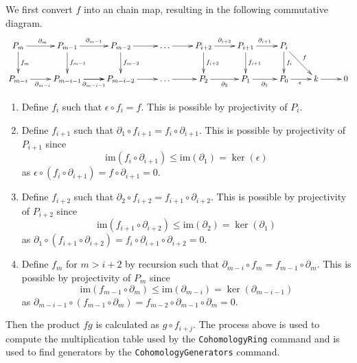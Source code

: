 \documentclass[12pt]{article}
\begin{document}
We first convert $f$ into an chain map,
resulting in the following commutative diagram.
\begin{equation}\label{ff}\xymatrix{
P_m\ar[r]^{\partial_m}\ar[d]^{f_m}
&P_{m-1}\ar[d]^{f_{m-1}}\ar[r]^{\partial_{m-1}}
&P_{m-2}\ar[d]^{f_{m-2}}\ar[r]
&\dots\ar[r]
&P_{i+2}\ar[r]^{\partial_{i+2}}\ar[d]^{f_{i+2}}
&P_{i+1}\ar[r]^{\partial_{i+1}}\ar[d]^{f_{i+1}}
&P_i\ar[d]^{f_i}\ar[dr]^f
\\
P_{m-i}\ar[r]_{\partial_{m-i}}
&P_{m-i-1}\ar[r]\ar[r]_{\partial_{m-i-1}}
&P_{m-i-2}\ar[r]
&\dots\ar[r]
&P_2\ar[r]_{\partial_2}
&P_1\ar[r]_{\partial_1}
&P_0\ar[r]_\epsilon&k\ar[r]&0
}\end{equation}
\begin{enumerate}
\item Define $f_i$ such that $\epsilon\circ f_i=f$.
This is possible by projectivity of $P_i$.
\item Define $f_{i+1}$ such that $\partial_1\circ f_{i+1}
=f_i\circ\partial_{i+1}$.
This is possible by projectivity of $P_{i+1}$ since
\[\mathrm{im}\left(f_i\circ\partial_{i+1}\right)
\le\mathrm{im}\left(\partial_1\right)
=\ker\left(\epsilon\right)\]
as $\epsilon\circ\left(f_i\circ\partial_{i+1}\right)
=f\circ\partial_{i+1}=0$.
\item Define $f_{i+2}$ such that $\partial_2\circ f_{i+2}
=f_{i+1}\circ\partial_{i+2}$.
This is possible by projectivity of $P_{i+2}$ since
\[\mathrm{im}\left(f_{i+1}\circ\partial_{i+2}\right)
\le\mathrm{im}\left(\partial_2\right)
=\ker\left(\partial_1\right)\]
as $\partial_1\circ\left(f_{i+1}\circ\partial_{i+2}\right)
=f_i\circ\partial_{i+1}\circ\partial_{i+2}=0$.
\item Define $f_m$ for $m>i+2$ by recursion 
such that $\partial_{m-i}\circ f_m
=f_{m-1}\circ\partial_m$.
This is possible by projectivity of $P_m$ since
\[\mathrm{im}\left(f_{m-1}\circ\partial_m\right)
\le\mathrm{im}\left(\partial_{m-i}\right)
=\ker\left(\partial_{m-i-1}\right)\]
as $\partial_{m-i-1}\circ\left(f_{m-1}\circ\partial_m\right)
=f_{m-2}\circ\partial_{m-1}\circ\partial_m=0$.
\end{enumerate}
Then the product $fg$ is calculated as $g\circ f_{i+j}$.
The process above is used to compute the multiplication
table used by the \verb!CohomologyRing! command
and is used to find generators by the \verb!CohomologyGenerators!
command.
\end{document}
